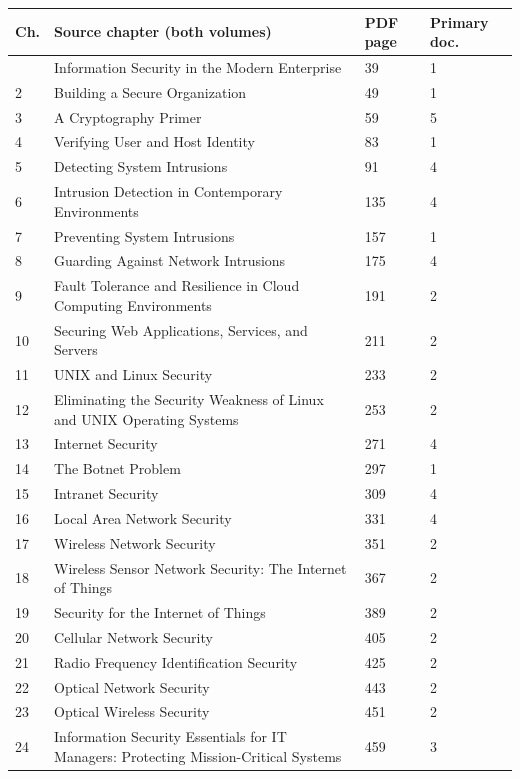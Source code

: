 \documentclass[10pt,letterpaper,oneside]{article}
\begin{document}
\small\par\medskip\noindent\begin{longtable}{@{}p{}p{}p{}p{}@{}}\toprule Ch. & Source chapter (both volumes) & PDF page & Primary doc. \\ \midrule\endhead\bottomrule\endfoot
1 & Information Security in the Modern Enterprise & 39 & 1 \\
2 & Building a Secure Organization & 49 & 1 \\
3 & A Cryptography Primer & 59 & 5 \\
4 & Verifying User and Host Identity & 83 & 1 \\
5 & Detecting System Intrusions & 91 & 4 \\
6 & Intrusion Detection in Contemporary Environments & 135 & 4 \\
7 & Preventing System Intrusions & 157 & 1 \\
8 & Guarding Against Network Intrusions & 175 & 4 \\
9 & Fault Tolerance and Resilience in Cloud Computing Environments & 191 & 2 \\
10 & Securing Web Applications, Services, and Servers & 211 & 2 \\
11 & UNIX and Linux Security & 233 & 2 \\
12 & Eliminating the Security Weakness of Linux and UNIX Operating Systems & 253 & 2 \\
13 & Internet Security & 271 & 4 \\
14 & The Botnet Problem & 297 & 1 \\
15 & Intranet Security & 309 & 4 \\
16 & Local Area Network Security & 331 & 4 \\
17 & Wireless Network Security & 351 & 2 \\
18 & Wireless Sensor Network Security: The Internet of Things & 367 & 2 \\
19 & Security for the Internet of Things & 389 & 2 \\
20 & Cellular Network Security & 405 & 2 \\
21 & Radio Frequency Identification Security & 425 & 2 \\
22 & Optical Network Security & 443 & 2 \\
23 & Optical Wireless Security & 451 & 2 \\
24 & Information Security Essentials for IT Managers: Protecting Mission-Critical Systems & 459 & 3 \\

\end{longtable}
\end{document}
